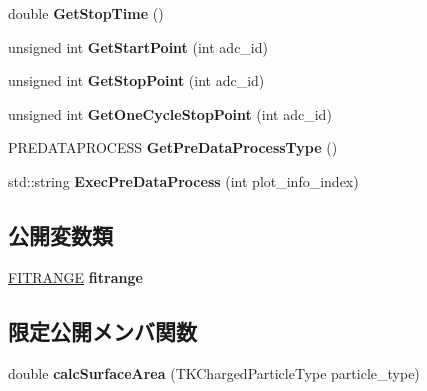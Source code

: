 \begin{DoxyCompactItemize}
double {\bfseries Get\+Stop\+Time} ()
\item 
\mbox{\label{class_t_k_a_n_a_l_y_z_e_aa26fd364fff1d69ead56a53d1d2de439}} 
unsigned int {\bfseries Get\+Start\+Point} (int adc\+\_\+id)
\item 
\mbox{\label{class_t_k_a_n_a_l_y_z_e_a561d27047b90eb3a344a1c86f5290605}} 
unsigned int {\bfseries Get\+Stop\+Point} (int adc\+\_\+id)
\item 
\mbox{\label{class_t_k_a_n_a_l_y_z_e_a607144cda4f6ad2cf472ee792c0aa8a7}} 
unsigned int {\bfseries Get\+One\+Cycle\+Stop\+Point} (int adc\+\_\+id)
\item 
\mbox{\label{class_t_k_a_n_a_l_y_z_e_ab1ff5012692d965c4a271c1c07f6488a}} 
P\+R\+E\+D\+A\+T\+A\+P\+R\+O\+C\+E\+SS {\bfseries Get\+Pre\+Data\+Process\+Type} ()
\item 
\mbox{\label{class_t_k_a_n_a_l_y_z_e_a5be002cc215145a2af05c85cf50aabe7}} 
std\+::string {\bfseries Exec\+Pre\+Data\+Process} (int plot\+\_\+info\+\_\+index)
\end{DoxyCompactItemize}
\subsection*{公開変数類}
\begin{DoxyCompactItemize}
\item 
\mbox{\label{class_t_k_a_n_a_l_y_z_e_a55e1a2c600ba6fb90f849f04e3dffc0d}} 
\hyperlink{class_t_k_a_n_a_l_y_z_e_1_1_f_i_t_r_a_n_g_e}{F\+I\+T\+R\+A\+N\+GE} {\bfseries fitrange}
\end{DoxyCompactItemize}
\subsection*{限定公開メンバ関数}
\begin{DoxyCompactItemize}
\item 
\mbox{\label{class_t_k_a_n_a_l_y_z_e_ab3051e2a2012e986b33a97a2389b2f47}} 
double {\bfseries calc\+Surface\+Area} (T\+K\+Charged\+Particle\+Type particle\+\_\+type)
\end{DoxyCompactItemize}
